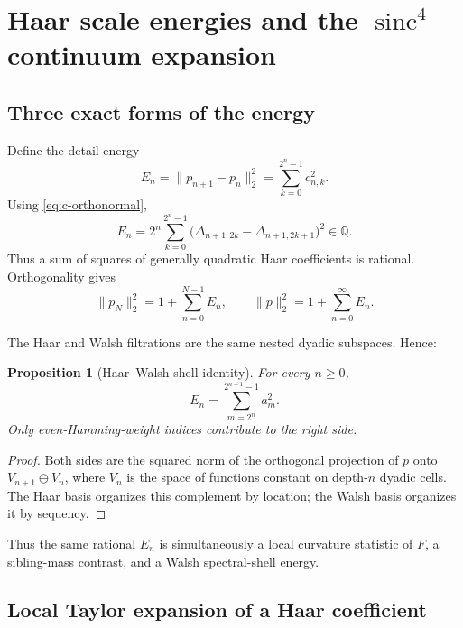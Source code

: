 \documentclass[11pt,oneside]{article}
\newtheorem{proposition}[theorem]{Proposition}
\theoremstyle{definition}
\theoremstyle{remark}
\newcommand{\Q}{\mathbb Q}
\newcommand{\sinc}{\operatorname{sinc}}
\begin{document}
\section{Haar scale energies and the $\sinc^4$ continuum expansion}
\label{sec:haar-energy}

\subsection{Three exact forms of the energy}

Define the detail energy
\begin{equation}\label{eq:En-def}
 E_n=\|p_{n+1}-p_n\|_2^2
 =\sum_{k=0}^{2^n-1}c_{n,k}^2.
\end{equation}
Using \eqref{eq:c-orthonormal},
\begin{equation}\label{eq:En-masses}
 E_n=2^n\sum_{k=0}^{2^n-1}
 \bigl(\Delta_{n+1,2k}-\Delta_{n+1,2k+1}\bigr)^2\in\Q.
\end{equation}
Thus a sum of squares of generally quadratic Haar coefficients is rational.
Orthogonality gives
\begin{equation}\label{eq:L2-energy-telescope}
 \|p_N\|_2^2=1+\sum_{n=0}^{N-1}E_n,
 \qquad
 \|p\|_2^2=1+\sum_{n=0}^\infty E_n.
\end{equation}

The Haar and Walsh filtrations are the same nested dyadic subspaces.  Hence:

\begin{proposition}[Haar--Walsh shell identity]
\label{prop:Haar-Walsh-shell}
For every $n\ge0$,
\begin{equation}\label{eq:Haar-Walsh-energy}
 E_n=\sum_{m=2^n}^{2^{n+1}-1}a_m^2.
\end{equation}
Only even-Hamming-weight indices contribute to the right side.
\end{proposition}

\begin{proof}
Both sides are the squared norm of the orthogonal projection of $p$ onto
$V_{n+1}\ominus V_n$, where $V_n$ is the space of functions constant on
depth-$n$ dyadic cells.  The Haar basis organizes this complement by location;
the Walsh basis organizes it by sequency.
\end{proof}

Thus the same rational $E_n$ is simultaneously a local curvature statistic of
$F$, a sibling-mass contrast, and a Walsh spectral-shell energy.

\subsection{Local Taylor expansion of a Haar coefficient}
\end{document}
